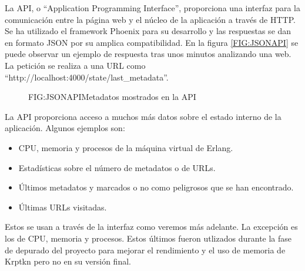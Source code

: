 La API, o ``Application Programming Interface'', proporciona una interfaz para la comunicación entre la página web y el núcleo de la aplicación a través de HTTP. Se ha utilizado el framework Phoenix para su desarrollo y las respuestas se dan en formato JSON por su amplica compatibilidad. En la figura \ref{FIG:JSONAPI} se puede observar un ejemplo de respuesta tras unos minutos analizando una web. La petición se realiza a una URL como ``http://localhost:4000/state/last\_metadata''.

\begin{figure}[jsonapi]{FIG:JSONAPI}{Metadatos mostrados en la API}
\end{figure}

La API proporciona acceso a muchos más datos sobre el estado interno de la aplicación. Algunos ejemplos son:

\begin{itemize}
  \item CPU, memoria y procesos de la máquina virtual de Erlang.
  \item Estadísticas sobre el número de metadatos o de URLs.
  \item Últimos metadatos y marcados o no como peligrosos que se han encontrado.
  \item Últimas URLs visitadas.
\end{itemize}

Estos  se usan a través de la interfaz como veremos más adelante. La excepción es los de CPU, memoria y procesos. Estos últimos fueron utlizados durante la fase de depurado del proyecto para mejorar el rendimiento y el uso de memoria de Krptkn pero no en su versión final.
